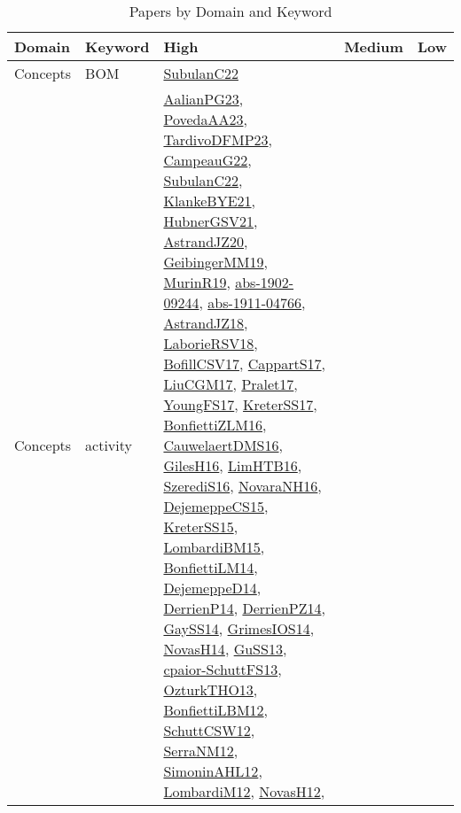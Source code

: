 {\scriptsize
\begin{longtable}{llp{6cm}p{6cm}p{6cm}}
\caption{Papers by Domain and Keyword}\\ \toprule
Domain & Keyword & High & Medium & Low\\ \midrule\endhead
\bottomrule
\endfoot
Concepts & BOM & \href{articles/SubulanC22.pdf}{SubulanC22}\cite{SubulanC22} &  & \\
Concepts & activity & \href{papers/AalianPG23.pdf}{AalianPG23}\cite{AalianPG23}, \href{papers/PovedaAA23.pdf}{PovedaAA23}\cite{PovedaAA23}, \href{papers/TardivoDFMP23.pdf}{TardivoDFMP23}\cite{TardivoDFMP23}, \href{articles/CampeauG22.pdf}{CampeauG22}\cite{CampeauG22}, \href{articles/SubulanC22.pdf}{SubulanC22}\cite{SubulanC22}, \href{papers/KlankeBYE21.pdf}{KlankeBYE21}\cite{KlankeBYE21}, \href{articles/HubnerGSV21.pdf}{HubnerGSV21}\cite{HubnerGSV21}, \href{articles/AstrandJZ20.pdf}{AstrandJZ20}\cite{AstrandJZ20}, \href{papers/GeibingerMM19.pdf}{GeibingerMM19}\cite{GeibingerMM19}, \href{papers/MurinR19.pdf}{MurinR19}\cite{MurinR19}, \href{articles/abs-1902-09244.pdf}{abs-1902-09244}\cite{abs-1902-09244}, \href{articles/abs-1911-04766.pdf}{abs-1911-04766}\cite{abs-1911-04766}, \href{papers/AstrandJZ18.pdf}{AstrandJZ18}\cite{AstrandJZ18}, \href{articles/LaborieRSV18.pdf}{LaborieRSV18}\cite{LaborieRSV18}, \href{papers/BofillCSV17.pdf}{BofillCSV17}\cite{BofillCSV17}, \href{papers/CappartS17.pdf}{CappartS17}\cite{CappartS17}, \href{papers/LiuCGM17.pdf}{LiuCGM17}\cite{LiuCGM17}, \href{papers/Pralet17.pdf}{Pralet17}\cite{Pralet17}, \href{papers/YoungFS17.pdf}{YoungFS17}\cite{YoungFS17}, \href{articles/KreterSS17.pdf}{KreterSS17}\cite{KreterSS17}, \href{papers/BonfiettiZLM16.pdf}{BonfiettiZLM16}\cite{BonfiettiZLM16}, \href{papers/CauwelaertDMS16.pdf}{CauwelaertDMS16}\cite{CauwelaertDMS16}, \href{papers/GilesH16.pdf}{GilesH16}\cite{GilesH16}, \href{papers/LimHTB16.pdf}{LimHTB16}\cite{LimHTB16}, \href{papers/SzerediS16.pdf}{SzerediS16}\cite{SzerediS16}, \href{articles/NovaraNH16.pdf}{NovaraNH16}\cite{NovaraNH16}, \href{papers/DejemeppeCS15.pdf}{DejemeppeCS15}\cite{DejemeppeCS15}, \href{papers/KreterSS15.pdf}{KreterSS15}\cite{KreterSS15}, \href{papers/LombardiBM15.pdf}{LombardiBM15}\cite{LombardiBM15}, \href{papers/BonfiettiLM14.pdf}{BonfiettiLM14}\cite{BonfiettiLM14}, \href{papers/DejemeppeD14.pdf}{DejemeppeD14}\cite{DejemeppeD14}, \href{papers/DerrienP14.pdf}{DerrienP14}\cite{DerrienP14}, \href{papers/DerrienPZ14.pdf}{DerrienPZ14}\cite{DerrienPZ14}, \href{papers/GaySS14.pdf}{GaySS14}\cite{GaySS14}, \href{articles/GrimesIOS14.pdf}{GrimesIOS14}\cite{GrimesIOS14}, \href{articles/NovasH14.pdf}{NovasH14}\cite{NovasH14}, \href{papers/GuSS13.pdf}{GuSS13}\cite{GuSS13}, \href{papers/cpaior-SchuttFS13.pdf}{cpaior-SchuttFS13}\cite{cpaior-SchuttFS13}, \href{articles/OzturkTHO13.pdf}{OzturkTHO13}\cite{OzturkTHO13}, \href{papers/BonfiettiLBM12.pdf}{BonfiettiLBM12}\cite{BonfiettiLBM12}, \href{papers/SchuttCSW12.pdf}{SchuttCSW12}\cite{SchuttCSW12}, \href{papers/SerraNM12.pdf}{SerraNM12}\cite{SerraNM12}, \href{papers/SimoninAHL12.pdf}{SimoninAHL12}\cite{SimoninAHL12}, \href{articles/LombardiM12.pdf}{LombardiM12}\cite{LombardiM12}, \href{articles/NovasH12.pdf}{NovasH12}\cite{NovasH12}, 
\end{longtable}}
